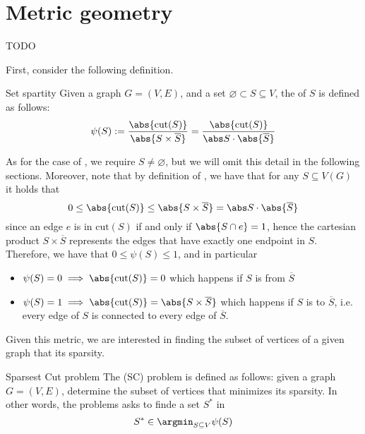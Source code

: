 \documentclass[a4paper, 12pt]{report}
\begin{document}
    \chapter{Metric geometry}

    TODO 

    First, consider the following definition.

    \begin{frameddefn}{Set spartity}
        Given a graph $G = (V, E)$, and a set $\varnothing \subset S \subseteq V$, the  of $S$ is defined as follows: $$\psi (S) := \dfrac{\abs{\mathrm{cut}(S)}}{\abs{S \times \overline S}} = \dfrac{\abs{\mathrm{cut}(S)}}{\abs S \cdot \abs{\overline S}}$$
    \end{frameddefn}

    As for the case of , we require $S \neq \varnothing$, but we will omit this detail in the following sections. Moreover, note that by definition of , we have that for any $S \subseteq V(G)$ it holds that $$0 \le \abs{\mathrm{cut}(S)} \le \abs {S \times \overline S} = \abs S \cdot \abs{\overline S}$$ since an edge $e$ is in $\mathrm{cut}(S)$ if and only if $\abs {S \cap e} = 1$, hence the cartesian product $S \times \overline S$ represents the edges that have exactly one endpoint in $S$. Therefore, we have that $0 \le \psi(S) \le 1$, and in particular

    \begin{itemize}
        \item $\psi(S) = 0 \implies \abs{\mathrm{cut}(S)} = 0$ which happens if $S$ is  from $\overline S$
        \item $\psi(S) = 1 \implies \abs{\mathrm{cut}(S)} = \abs{S \times \overline S}$ which happens if $S$ is  to $\overline S$, i.e. every edge of $S$ is connected to every edge of $\overline S$.
    \end{itemize}

    Given this metric, we are interested in finding the subset of vertices of a given graph that  its sparsity.

    \begin{frameddefn}{Sparsest Cut problem}
        The  (SC) problem is defined as follows: given a graph $G = (V, E)$, determine the subset of vertices that minimizes its sparsity. In other words, the problems asks to finde a set $S^*$ in $$S^* \in \argmin_{S \subseteq V}{\psi(S)}$$
    \end{frameddefn}
\end{document}
